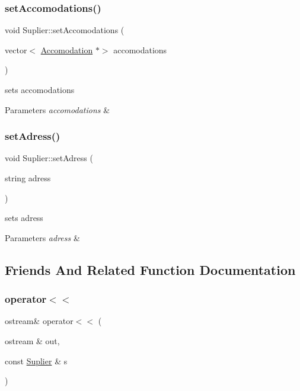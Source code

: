\subsubsection{\texorpdfstring{set\+Accomodations()}{setAccomodations()}}
{\footnotesize\ttfamily void Suplier\+::set\+Accomodations (\begin{DoxyParamCaption}\item[{vector$<$ \hyperlink{class_accomodation}{Accomodation} $\ast$$>$}]{accomodations }\end{DoxyParamCaption})\hspace{0.3cm}{\ttfamily [inline]}}



sets accomodations 


\begin{DoxyParams}{Parameters}
{\em accomodations} & \\
\hline
\end{DoxyParams}
\hypertarget{class_suplier_a35d4dcc54e96c079ac8792806eeed739}{}\label{class_suplier_a35d4dcc54e96c079ac8792806eeed739} 
\subsubsection{\texorpdfstring{set\+Adress()}{setAdress()}}
{\footnotesize\ttfamily void Suplier\+::set\+Adress (\begin{DoxyParamCaption}\item[{string}]{adress }\end{DoxyParamCaption})\hspace{0.3cm}{\ttfamily [inline]}}



sets adress 


\begin{DoxyParams}{Parameters}
{\em adress} & \\
\hline
\end{DoxyParams}


\subsection{Friends And Related Function Documentation}
\hypertarget{class_suplier_aab546dada0bfe696a156bc9f08bd5675}{}\label{class_suplier_aab546dada0bfe696a156bc9f08bd5675} 
\subsubsection{\texorpdfstring{operator$<$$<$}{operator<<}}
{\footnotesize\ttfamily ostream\& operator$<$$<$ (\begin{DoxyParamCaption}\item[{ostream \&}]{out,  }\item[{const \hyperlink{class_suplier}{Suplier} \&}]{s }\end{DoxyParamCaption})\hspace{0.3cm}{\ttfamily [friend]}}




